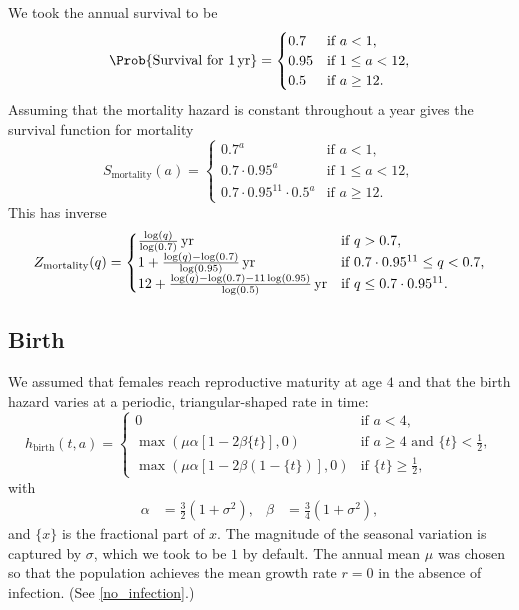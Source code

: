 \documentclass{jpmarticle}
\begin{document}
We took the annual survival to be
\begin{equation}
  \Prob\{\text{Survival for $\unit[1]{yr}$}\}
  =
  \begin{cases}
    0.7 & \text{if $a < 1$},
    \\
    0.95 & \text{if $1 \leq a < 12$},
    \\
    0.5 & \text{if $a \geq 12$}.
  \end{cases}
\end{equation}
Assuming that the mortality hazard is constant throughout a year gives
the survival function for mortality
\begin{equation}
  S_{\text{mortality}}(a) =
  \begin{cases}
    0.7^a & \text{if $a < 1$},
    \\
    0.7 \cdot 0.95^a & \text{if $1 \leq a < 12$},
    \\
    0.7 \cdot 0.95^{11} \cdot 0.5^a & \text{if $a \geq 12$}.
  \end{cases}
\end{equation}
This has inverse
\begin{equation}
  Z_{\text{mortality}}(q) =
  \begin{cases}
    \unit[\frac{\log(q)}{\log(0.7)}]{yr} & \text{if $q > 0.7$},
    \\
    \unit[1 + \frac{\log(q) - \log(0.7)}{\log(0.95)}]{yr}
    & \text{if $0.7 \cdot 0.95^{11} \leq q < 0.7$},
    \\
    \unit[12 + \frac{\log(q) - \log(0.7) - 11 \log(0.95)}{\log(0.5)}]{yr}
    & \text{if $q \leq 0.7 \cdot 0.95^{11}$}.
  \end{cases}
\end{equation}


\subsection{Birth}

We assumed that females reach reproductive maturity at age $4$ and
that the birth hazard varies at a periodic, triangular-shaped rate in
time:
\begin{equation}
  h_{\text{birth}}(t, a) =
  \begin{cases}
    0 & \text{if $a < 4$},
    \\
    \max\left(\mu \alpha \left[1 - 2 \beta \{t\}\right], 0\right)
    & \text{if $a \geq 4$ and $\{t\} < \frac{1}{2}$},
    \\
    \max\left(\mu \alpha \left[1 - 2 \beta (1 - \{t\})\right], 0\right)
    & \text{if $\{t\} \geq \frac{1}{2}$},
  \end{cases}
\end{equation}
with
\begin{align}
  \alpha &= \frac{3}{2} \left(1 + \sigma^2\right),
  &
  \beta &= \frac{3}{4} \left(1 + \sigma^2\right),
\end{align}
and $\{x\}$ is the fractional part of $x$.  The magnitude of the
seasonal variation is captured by $\sigma$, which we took to be $1$ by
default.  The annual mean $\mu$ was chosen so that the population
achieves the mean growth rate $r = 0$ in the absence of infection.
(See \autoref{no_infection}.)
\end{document}
